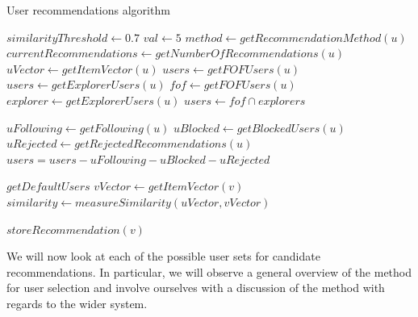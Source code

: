 \begin{algorithm}[H]
\caption{User recommendations algorithm}
\label{alg:user-recommendations}
\begin{algorithmic}[1]
\State $similarityThreshold\gets 0.7$
\State $val\gets 5$
    \State $method\gets getRecommendationMethod(u)$
    \State $currentRecommendations\gets getNumberOfRecommendations(u)$
        \State $uVector\gets getItemVector(u)$
            \State $users\gets getFOFUsers(u)$
        \EndIf
            \State $users\gets getExplorerUsers(u)$
        \EndIf
            \State $fof\gets getFOFUsers(u)$
            \State $explorer\gets getExplorerUsers(u)$
            \State $users\gets fof \cap explorers$
        \EndIf
        
        \State $uFollowing\gets getFollowing(u)$
        \State $uBlocked\gets getBlockedUsers(u)$
        \State $uRejected\gets getRejectedRecommendations(u)$
        \State $users = users - uFollowing - uBlocked - uRejected$
        
            \State $getDefaultUsers$
        \Else
                \State $vVector\gets getItemVector(v)$
                \State $similarity\gets measureSimilarity(uVector, vVector)$
            
                    \State $storeRecommendation(v)$
                \EndIf
            \EndFor
        \EndIf
    \EndIf
\EndFor
\end{algorithmic}
\end{algorithm}

We will now look at each of the possible user sets for candidate recommendations. In particular, we will observe a general overview of the method for user selection and involve ourselves with a discussion of the method with regards to the wider system.

